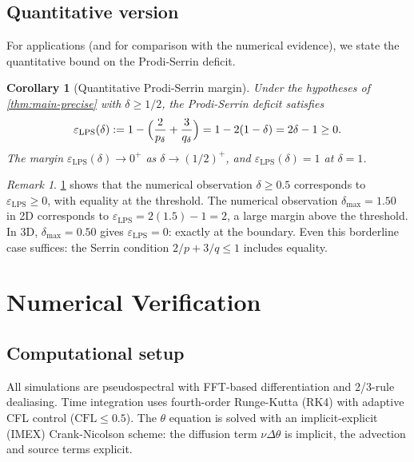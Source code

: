 \documentclass[12pt]{article}
\theoremstyle{plain}
\newtheorem{corollary}[theorem]{Corollary}
\theoremstyle{definition}
\theoremstyle{remark}
\newtheorem{remark}[theorem]{Remark}
\newcommand{\eps}{\varepsilon}
\newcommand{\lap}{\Delta}
\newcommand{\LPS}{\text{LPS}}
\begin{document}
\subsection{Quantitative version}

For applications (and for comparison with the numerical evidence), we state
the quantitative bound on the Prodi-Serrin deficit.

\begin{corollary}[Quantitative Prodi-Serrin margin]\label{cor:quantitative}
  Under the hypotheses of \cref{thm:main-precise} with $\delta\geq 1/2$,
  the Prodi-Serrin deficit satisfies
  \begin{equation}\label{eq:lps-margin}
    \eps_{\LPS}(\delta)
    := 1 - \Bigl(\frac{2}{p_\delta}+\frac{3}{q_\delta}\Bigr)
    = 1 - 2(1-\delta) = 2\delta - 1 \geq 0.
  \end{equation}
  The margin $\eps_{\LPS}(\delta)\to 0^+$ as $\delta\to(1/2)^+$, and
  $\eps_{\LPS}(\delta)=1$ at $\delta=1$.
\end{corollary}

\begin{remark}
  \cref{cor:quantitative} shows that the numerical observation $\delta\geq 0.5$
  corresponds to $\eps_{\LPS}\geq 0$, with equality at the threshold.
  The numerical observation $\delta_{\max}=1.50$ in 2D corresponds to
  $\eps_{\LPS}=2(1.5)-1=2$, a large margin above the threshold.
  In 3D, $\delta_{\max}=0.50$ gives $\eps_{\LPS}=0$: exactly at the boundary.
  Even this borderline case suffices: the Serrin condition
  $2/p+3/q\leq 1$ includes equality.
\end{remark}

\section{Numerical Verification}\label{sec:numerics}

\subsection{Computational setup}

All simulations are pseudospectral with FFT-based differentiation and
2/3-rule dealiasing.
Time integration uses fourth-order Runge-Kutta (RK4) with adaptive CFL control
($\text{CFL}\leq 0.5$).
The $\theta$ equation is solved with an implicit-explicit (IMEX) Crank-Nicolson
scheme: the diffusion term $\nu\lap\theta$ is implicit, the advection and source
terms explicit.
\end{document}
